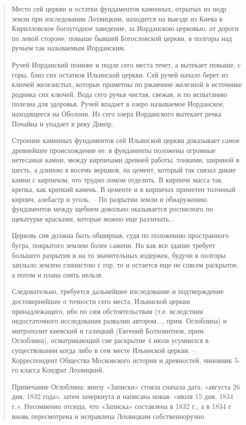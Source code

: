 \begin{quotation}
Место сей церкви и остатки фундаментов каменных, отрытых из недр земли при изследовании Лохвицким, находится на выезде из Киева в Кирилловское богоугодное заведение, за Иорданскою церковью, от дороги по левой стороне, повыше бывшей Богословской церкви, в полгоры над ручьем так называемым Иорданским.

Ручей Иорданский пониже и подле сего места течет, а вытекает повыше, с горы, близ сих остатков Ильинской церкви. Сей ручей начало берет из ключей железистых, которые приметны по ржавчине железной в источнике родника сих ключей. Вода сего ручья чистая, свежая, и по испытанию полезна для здоровья. Ручей впадает в озеро называемое Иорданское, находящееся на Оболони. Из сего озера Иорданского вытекает речка Почайна и упадает в реку Днепр.

Строение каменных фундаментов сей Ильинской церкви доказывает самое древнейшее происхождение ее: в фундаменты положены огромные нетесаные камни, между кирпичами древней работы, тонкими, шириной в шесть, а длиною в восемь вершков, на цемент, который так связал дикие камни с кирпичом, что трудно ломом отделить. В кирпиче масса так крепка, как крепкий камень. В цементе и в кирпичах приметен толченый кирпич, алебастр и уголь. – По разрытии земли и обнаружению фундаментов между щебнем довольно оказывается росписного по щекатурке красками, которые можно еще различать...

Церковь сия должна быть обширная, судя по положению пространного бугра, покрытого землею более сажени. Но как все здание требует большего разрытия и на то значительных издержек, будучи в полгоры заплыло землею глинистою с гор, то и остается еще не совсем раскрытое, а потом и плана снять нельзя. 

Следовательно, требуется дальнейшее изследование и подтверждение достовернейшее о точности сего места, Ильинской церкви принадлежащего, ибо по сим обстоятельствам (т.е. вследствии недостаточного исследования развалин автором..., прим. Оглоблина) и митрополит киевский и галицкий (Евгений Болховитнов, прим. Оглоблина), осматривающий сие раскрытие 4 июля усумнился в существовании когда либо в сем месте Ильинской церкви. – Корреспондент Общества Московского истории и древностей, чиновник 5-го класса Кондрат Лохвицкий.

Примечание Оглоблина: внизу «Записки» стояла сначала дата: «августа 26 дня, 1832 года», затем зачеркнута и написана новая: «июля 15 дня, 1834 г.». Несомненно отсюда, что «Записка» составлена в 1832 г., а в 1834 г вновь пересмотрена и исправлена Лохвицким собственноручно.
\end{quotation}

